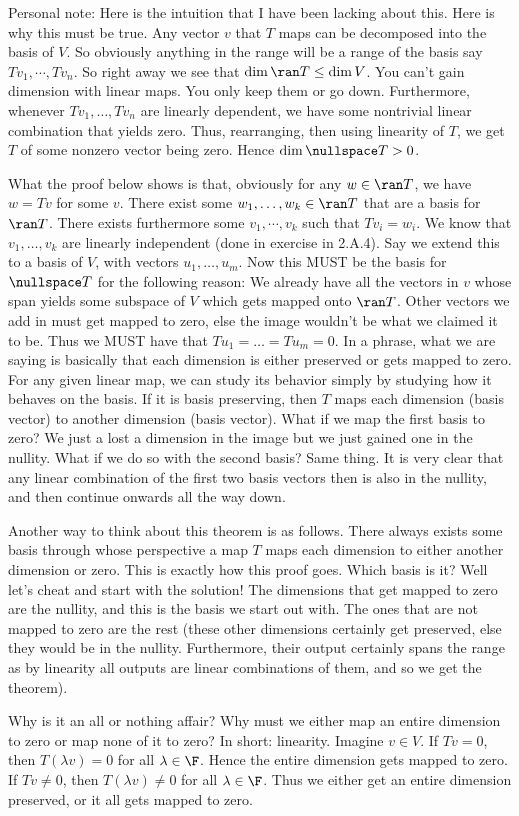 \documentclass{article}
\begin{document}
  \begin{remark}
    Personal note: Here is the intuition that I have been lacking about this. Here is why this must be true. Any vector $v$ that $T$ maps can be decomposed into the basis of $V$. So
    obviously anything in the range will be a range of the basis say $Tv_1, \cdots, Tv_n$. So right away we see that $\dim\ran T \leq \dim V$. You can't gain dimension with linear maps. You
    only keep them or go down. Furthermore, whenever $Tv_1, \dots, Tv_n$ are linearly dependent, we have some nontrivial linear combination that yields zero. Thus, rearranging, then using
    linearity of $T$, we get $T$ of some nonzero vector being zero. Hence $\dim\nullspace T > 0$.

    What the proof below shows is that, obviously for any $w \in \ran T$, we have $w = Tv$ for some $v$. There exist some $w_1, \dots, w_k \in \ran T$ that are a basis for $\ran T$. There
    exists furthermore some $v_1, \cdots, v_k$ such that $Tv_i = w_i$. We know that $v_1, \dots, v_k$ are linearly independent (done in exercise in 2.A.4). Say we extend this to a basis of
    $V$, with vectors $u_1, \dots, u_m$. Now this MUST be the basis for $\nullspace T$ for the following reason: We already have all the vectors in $v$ whose span yields some subspace of $V$
    which gets mapped onto $\ran T$. Other vectors we add in must get mapped to zero, else the image wouldn't be what we claimed it to be. Thus we MUST have that $Tu_1 = \dots = Tu_m = 0$.
    In a phrase, what we are saying is basically that each dimension is either preserved or gets mapped to zero. For any given linear map, we can study its behavior simply by studying how it
    behaves on the basis. If it is basis preserving, then $T$ maps each dimension (basis vector) to another dimension (basis vector). What if we map the first basis to zero? We just a lost a
    dimension in the image but we just gained one in the nullity. What if we do so with the second basis? Same thing. It is very clear that any linear combination of the first two basis
    vectors then is also in the nullity, and then continue onwards all the way down.

    Another way to think about this theorem is as follows. There always exists some basis through whose perspective a map $T$ maps each dimension to either another dimension or zero. This is
    exactly how this proof goes. Which basis is it? Well let's cheat and start with the solution! The dimensions that get mapped to zero are the nullity, and this is the basis we start out
    with. The ones that are not mapped to zero are the rest (these other dimensions certainly get preserved, else they would be in the nullity. Furthermore, their output certainly spans the
    range as by linearity all outputs are linear combinations of them, and so we get the theorem).

    Why is it an all or nothing affair? Why must we either map an entire dimension to zero or map none of it to zero? In short: linearity. Imagine $v \in V$. If $Tv = 0$, then $T(\lambda v) =
    0$ for all $\lambda \in \F$. Hence the entire dimension gets mapped to zero. If $Tv \neq 0$, then $T(\lambda v) \neq 0$ for all $\lambda \in \F$. Thus we either get an entire dimension
    preserved, or it all gets mapped to zero.
  \end{remark}
\end{document}
